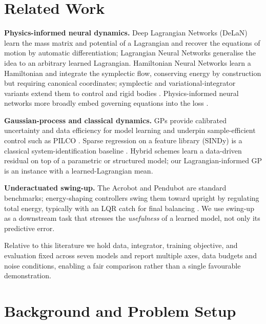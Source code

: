 \documentclass[conference]{IEEEtran}
\begin{document}
\section{Related Work}
\textbf{Physics-informed neural dynamics.} Deep Lagrangian Networks (DeLaN)
\cite{lutter2019} learn the mass matrix and potential of a Lagrangian and recover
the equations of motion by automatic differentiation; Lagrangian Neural Networks
\cite{cranmer2020} generalise the idea to an arbitrary learned Lagrangian.
Hamiltonian Neural Networks \cite{greydanus2019} learn a Hamiltonian and
integrate the symplectic flow, conserving energy by construction but requiring
canonical coordinates; symplectic and variational-integrator variants extend them
to control and rigid bodies \cite{zhong2020,saemundsson2020}. Physics-informed
neural networks more broadly embed governing equations into the loss
\cite{raissi2019,karniadakis2021}.

\textbf{Gaussian-process and classical dynamics.} GPs provide calibrated
uncertainty and data efficiency for model learning \cite{rasmussen2006,nguyen2011}
and underpin sample-efficient control such as PILCO \cite{deisenroth2011}. Sparse
regression on a feature library (SINDy) is a classical system-identification
baseline \cite{brunton2016}. Hybrid schemes learn a data-driven residual on top of
a parametric or structured model; our Lagrangian-informed GP is an instance with a
learned-Lagrangian mean.

\textbf{Underactuated swing-up.} The Acrobot and Pendubot are standard benchmarks;
energy-shaping controllers swing them toward upright by regulating total energy,
typically with an LQR catch for final balancing \cite{spong1995,tedrake}. We use
swing-up as a downstream task that stresses the \emph{usefulness} of a learned
model, not only its predictive error.

Relative to this literature we hold data, integrator, training objective, and
evaluation fixed across seven models and report multiple axes, data budgets and
noise conditions, enabling a fair comparison rather than a single favourable
demonstration.

\section{Background and Problem Setup}
\end{document}
